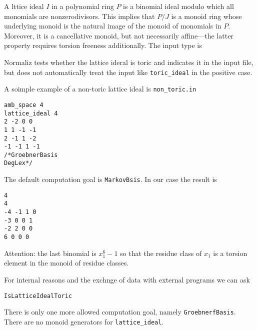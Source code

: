 A lttice ideal $I$ in a polynomial ring $P$ is a binomial ideal modulo which all monomials are nonzerodivisors. This implies that $P/J$ is a monoid ring whose underlying monoid is the natural image of the monoid of monomials in $P$. Moreover, it is a cancellative monoid, but not necessarily affine---the latter property requires torsion freeness additionally. The input type is
\begin{itemize}
\end{itemize}
Normaliz tests whether the lattice ideral is toric and indicates it in the input file, but does not automatically treat the input like \verb|toric_ideal| in the positive case.

A soimple example of a non-toric lattice ideal is \verb|non_toric.in|
\begin{Verbatim}
amb_space 4
lattice_ideal 4
2 -2 0 0
1 1 -1 -1
2 -1 1 -2
-1 -1 1 -1
/*GroebnerBasis
DegLex*/
\end{Verbatim}
The default computation goal is \verb|MarkovBsis|. In our case the result is
\begin{Verbatim}
4
4
-4 -1 1 0 
-3 0 0 1 
-2 2 0 0 
6 0 0 0
\end{Verbatim}
Attention: the last binomial is $x_1^6-1$ so that the residue class of $x_1$ is a torsion element in the monoid of residue classes.

For internal reasons and the exchnge of data with external programs we can ask
\begin{Verbatim}
IsLatticeIdealToric
\end{Verbatim}

There is only one more allowed computation goal, namely \verb|GroebnerfBasis|. There are no monoid generators for \verb|lattice_ideal|.
